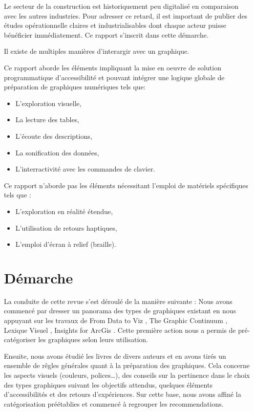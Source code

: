 \documentclass[a4paper,12pt]{article}
\begin{document}
\begin{multicols}{2}
Le secteur de la construction est historiquement peu digitalisé en comparaison avec les autres industries.\autocite{safurazabidinBibliometricScientometricMapping2020} Pour adresser ce retard, il est important de publier des études opérationnelle claires et industrialisables dont chaque acteur puisse bénéficier immédiatement. Ce rapport s'inscrit dans cette démarche.


Il existe de multiples manières d'interargir avec un graphique. \autocite{schwabishCenteringAccessibilityData2022a,frankelavskyRightToolsJob2022}

Ce rapport aborde les éléments impliquant la mise en oeuvre de solution programmatique d'accessibilité et pouvant intégrer une logique globale de préparation de graphiques numériques tels que:
\begin{itemize}
\item L'exploration visuelle,
\item La lecture des tables,
\item L'écoute des descriptions,
\item La sonification des données,
\item L'interractivité avec les commandes de clavier.
\end{itemize}

Ce rapport n'aborde pas les éléments nécessitant l'emploi de matériels spécifiques tels que :
\begin{itemize}
\item L'exploration en réalité étendue,
\item L'utilisation de retours haptiques,
\item L'emploi d'écran à relief (braille).
\end{itemize}
\section*{Démarche}
\label{sec:orge5afb31}
La conduite de cette revue s'est déroulé de la manière suivante :
Nous avons commencé par dresser un panorama des types de graphiques existant en nous appuyant sur les travaux de \og From Data to Viz\fg{} \autocite{yanholtzDataViz2018}, \og The Graphic Continuum\fg{} \autocite{jonathanschwabishGraphicContinuum2014}, \og Lexique Visuel\fg{} \autocite{alansmithLexiqueVisuel}, \og Insights for ArcGis\fg{} \autocite{lindabealeInsightsArcGIS2017}.
Cette première action nous a permis de pré-catégoriser les graphiques selon leurs utilisation.

Ensuite, nous avons étudié les livres de divers auteurs et en avons tirés un ensemble de rêgles générales quant à la préparation des graphiques. Cela concerne les aspects visuels (couleurs, polices\ldots{}), des conseils sur la pertinence dans le choix des types graphiques suivant les objectifs attendus, quelques éléments d'accessibilités et des retours d'expériences. Sur cette base, nous avons affiné la catégorisation préétablies et commencé à regrouper les recommendations.


\end{multicols}
\end{document}
